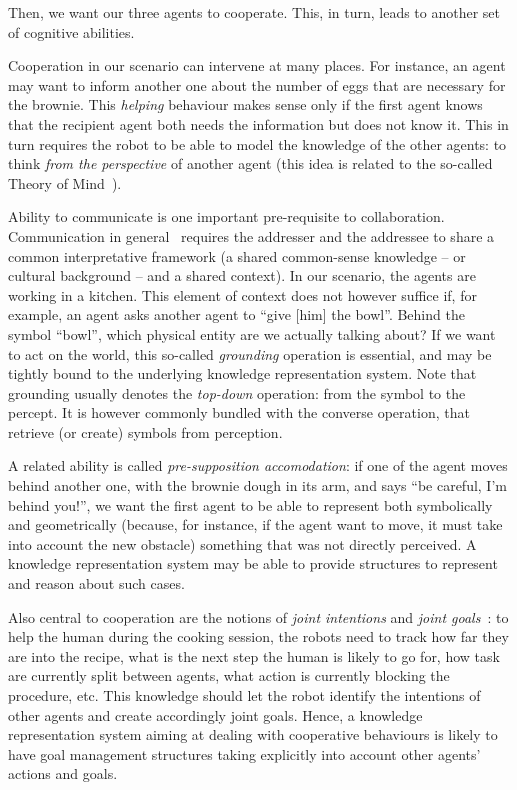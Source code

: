 \documentclass[a4paper, twocolumn]{article}
\begin{document}
Then, we want our three agents to cooperate. This, in turn, leads to another
set of cognitive abilities.

Cooperation in our scenario can intervene at many places. For instance, an
agent may want to inform another one about the number of eggs that are
necessary for the brownie. This \emph{helping} behaviour makes sense only if
the first agent knows that the recipient agent both needs the information but
does not know it. This in turn requires the robot to be able to model the
knowledge of the other agents: to think \emph{from the perspective} of another
agent (this idea is related to the so-called Theory of Mind~\cite{Leslie2000}).

Ability to communicate is one important pre-requisite to collaboration.
Communication in general~\cite{Jakobson1960} requires the addresser and the
addressee to share a common interpretative framework (a shared common-sense
knowledge -- or cultural background -- and a shared context). In our scenario,
the agents are working in a kitchen. This element of context does not however
suffice if, for example, an agent asks another agent to ``give {[him]} the
bowl''. Behind the symbol ``bowl'', which physical entity are we actually
talking about? If we want to act on the world, this so-called \emph{grounding}
operation is essential, and may be tightly bound to the underlying knowledge
representation system. Note that grounding usually denotes the {\it top-down}
operation: from the symbol to the percept. It is however commonly bundled with
the converse operation, that retrieve (or create) symbols from perception.

A related ability is called \emph{pre-supposition accomodation}: if one of the
agent moves behind another one, with the brownie dough in its arm, and says
``be careful, I'm behind you!'', we want the first agent to be able to
represent both symbolically and geometrically (because, for instance, if the
agent want to move, it must take into account the new obstacle) something that
was not directly perceived. A knowledge representation system may be able to
provide structures to represent and reason about such cases.

Also central to cooperation are the notions of \emph{joint
intentions} and \emph{joint goals}~\cite{Tomasello2005, Bratman2009}: to help
the human during the cooking session, the robots need to track how far
they are into the recipe, what is the next step the human is likely to go for,
how task are currently split between agents, what action is currently
blocking the procedure, etc. This knowledge should let the robot identify the
intentions of other agents and create accordingly joint goals. Hence, a
knowledge representation system aiming at dealing with cooperative behaviours
is likely to have goal management structures taking explicitly into account
other agents' actions and goals.
\end{document}
